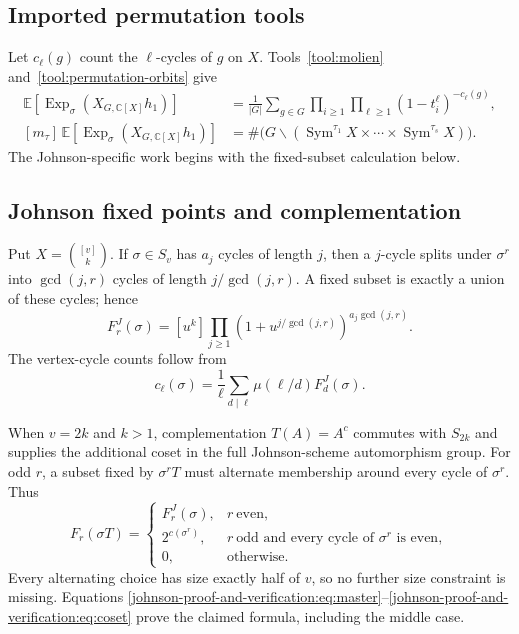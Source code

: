 \documentclass[10pt]{article}
\newcommand{\Sym}{\operatorname{Sym}}
\newcommand{\ExpS}{\operatorname{Exp}_{\sigma}}
\newcommand{\smgv}[2]{\mathbb E\!\left[\ExpS\!\left(X_{#1,#2}h_1\right)\right]}
\begin{document}
\subsection{Imported permutation tools}
Let $c_\ell(g)$ count the $\ell$-cycles of $g$ on $X$.  Tools~\ref{tool:molien}
and~\ref{tool:permutation-orbits} give
\begin{align}
 \smgv{G}{\mathbb C[X]}
 &=\frac1{|G|}\sum_{g\in G}
 \prod_{i\ge1}\prod_{\ell\ge1}(1-t_i^\ell)^{-c_\ell(g)},
 \label{johnson-proof-and-verification:eq:master}\\
 [m_\tau]\,\smgv{G}{\mathbb C[X]}
 &=\#\bigl(G\backslash
 (\Sym^{\tau_1}X\times\cdots\times\Sym^{\tau_s}X)\bigr).
 \label{johnson-proof-and-verification:eq:orbit}
\end{align}
The Johnson-specific work begins with the fixed-subset calculation below.

\subsection{Johnson fixed points and complementation}
Put $X=\binom{[v]}k$.  If $\sigma\in S_v$ has $a_j$ cycles of length $j$,
then a $j$-cycle splits under $\sigma^r$ into $\gcd(j,r)$ cycles of length
$j/\gcd(j,r)$.  A fixed subset is exactly a union of these cycles; hence
\begin{equation}\label{johnson-proof-and-verification:eq:johnsonfixed}
 F_r^J(\sigma)=[u^k]\prod_{j\ge1}
 \left(1+u^{j/\gcd(j,r)}\right)^{a_j\gcd(j,r)}.
\end{equation}
The vertex-cycle counts follow from
\begin{equation}\label{johnson-proof-and-verification:eq:mobius}
 c_\ell(\sigma)=\frac1\ell\sum_{d\mid\ell}
 \mu(\ell/d)F_d^J(\sigma).
\end{equation}

When $v=2k$ and $k>1$, complementation $T(A)=A^c$ commutes with $S_{2k}$
and supplies the additional coset in the full Johnson-scheme automorphism
group.  For odd $r$, a subset fixed by $\sigma^rT$ must alternate membership
around every cycle of $\sigma^r$.  Thus
\begin{equation}\label{johnson-proof-and-verification:eq:coset}
F_r(\sigma T)=\begin{cases}
F_r^J(\sigma),&r\ \text{even},\\
2^{c(\sigma^r)},&r\ \text{odd and every cycle of $\sigma^r$ is even},\\
0,&\text{otherwise}.
\end{cases}
\end{equation}
Every alternating choice has size exactly half of $v$, so no further size
constraint is missing.  Equations \eqref{johnson-proof-and-verification:eq:master}--\eqref{johnson-proof-and-verification:eq:coset} prove
the claimed formula, including the middle case.
\end{document}
